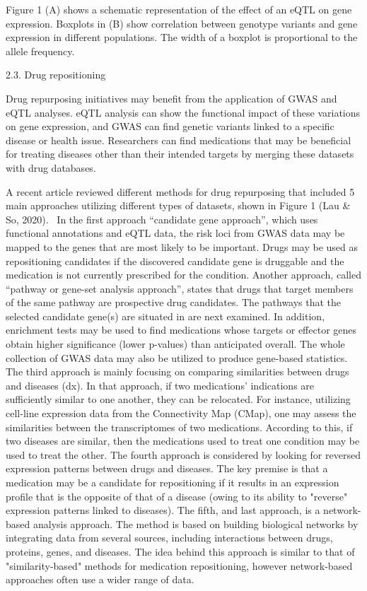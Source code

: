 \documentclass[
]{article}
\begin{document}
\hfill\break

Figure 1 (A) shows a schematic representation of the effect of an eQTL
on gene expression. Boxplots in (B) show correlation between genotype
variants and gene expression in different populations. The width of a
boxplot is proportional to the allele frequency.

2.3. Drug repositioning{~}

Drug repurposing initiatives may benefit from the application of GWAS
and eQTL analyses. eQTL analysis can show the functional impact of these
variations on gene expression, and GWAS can find genetic variants linked
to a specific disease or health issue. Researchers can find medications
that may be beneficial for treating diseases other than their intended
targets by merging these datasets with drug databases.{~}

A recent article reviewed different methods for drug repurposing that
included 5 main approaches utilizing different types of datasets, shown
in Figure 1 (Lau \& So, 2020).{~ }In the first approach ``candidate gene
approach'', which uses functional annotations and eQTL data, the risk
loci from GWAS data may be mapped to the genes that are most likely to
be important. Drugs may be used as repositioning candidates if the
discovered candidate gene is druggable and the medication is not
currently prescribed for the condition. Another approach, called
``pathway or gene-set analysis approach'', states that drugs that target
members of the same pathway are prospective drug candidates. The
pathways that the selected candidate gene(s) are situated in are next
examined. In addition, enrichment tests may be used to find medications
whose targets or effector genes obtain higher significance (lower
p-values) than anticipated overall. The whole collection of GWAS data
may also be utilized to produce gene-based statistics. The third
approach is mainly focusing on comparing similarities between drugs and
diseases (dx). In that approach, if two medications' indications are
sufficiently similar to one another, they can be relocated. For
instance, utilizing cell-line expression data from the Connectivity Map
(CMap), one may assess the similarities between the transcriptomes of
two medications. According to this, if two diseases are similar, then
the medications used to treat one condition may be used to treat the
other. The fourth approach is considered by looking for reversed
expression patterns between drugs and diseases. The key premise is that
a medication may be a candidate for repositioning if it results in an
expression profile that is the opposite of that of a disease (owing to
its ability to "reverse" expression patterns linked to diseases). The
fifth, and last approach, is a network-based analysis approach. The
method is based on building biological networks by integrating data from
several sources, including interactions between drugs, proteins, genes,
and diseases. The idea behind this approach is similar to that of
"similarity-based" methods for medication repositioning, however
network-based approaches often use a wider range of data.
\end{document}
